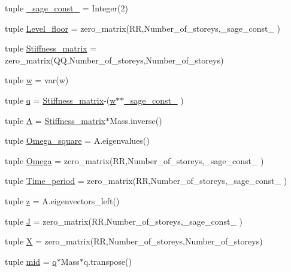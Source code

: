 \begin{DoxyCompactItemize}
\item 
tuple \hyperlink{namespacemain_ad85d7913c0e40b9e1f30e64611a0fafa}{\+\_\+sage\+\_\+const\+\_} = Integer(2)
\item 
tuple \hyperlink{namespacemain_ad7b051da0e829aff37fef1e171e37fa3}{Level\+\_\+floor} = zero\+\_\+matrix(R\+R,Number\+\_\+of\+\_\+storeys,\+\_\+sage\+\_\+const\+\_ )
\item 
tuple \hyperlink{namespacemain_a0011be18dbc87087d6aaf28802f121c0}{Stiffness\+\_\+matrix} = zero\+\_\+matrix(Q\+Q,Number\+\_\+of\+\_\+storeys,Number\+\_\+of\+\_\+storeys)
\item 
tuple \hyperlink{namespacemain_af76005101c339a32cd5d37ba82ee072c}{w} = var(\textquotesingle{}w\textquotesingle{})
\item 
tuple \hyperlink{namespacemain_a1787a37505189f764069a45071189112}{q} = \hyperlink{namespacemain_a0011be18dbc87087d6aaf28802f121c0}{Stiffness\+\_\+matrix}-\/(\hyperlink{namespacemain_af76005101c339a32cd5d37ba82ee072c}{w}$\ast$$\ast$\hyperlink{namespacemain_ad85d7913c0e40b9e1f30e64611a0fafa}{\+\_\+sage\+\_\+const\+\_} )
\item 
tuple \hyperlink{namespacemain_ad101f166a53497f04b37636bcadbfe65}{A} = \hyperlink{namespacemain_a0011be18dbc87087d6aaf28802f121c0}{Stiffness\+\_\+matrix}$\ast$Mass.\+inverse()
\item 
tuple \hyperlink{namespacemain_a63066086ca439ff34de16475b00387f5}{Omega\+\_\+square} = A.\+eigenvalues()
\item 
tuple \hyperlink{namespacemain_af44dcb60e61649c65257466d65b4d548}{Omega} = zero\+\_\+matrix(R\+R,Number\+\_\+of\+\_\+storeys,\+\_\+sage\+\_\+const\+\_ )
\item 
tuple \hyperlink{namespacemain_a6bf4b8266bcb3b4f390149620fea3d6c}{Time\+\_\+period} = zero\+\_\+matrix(R\+R,Number\+\_\+of\+\_\+storeys,\+\_\+sage\+\_\+const\+\_ )
\item 
tuple \hyperlink{namespacemain_a2d5b336e3b2f7d2e14f04fa3cc413457}{z} = A.\+eigenvectors\+\_\+left()
\item 
tuple \hyperlink{namespacemain_a00488f5887e168f7781b6fb94dd08518}{J} = zero\+\_\+matrix(R\+R,Number\+\_\+of\+\_\+storeys,\+\_\+sage\+\_\+const\+\_ )
\item 
tuple \hyperlink{namespacemain_a5eac8e4368036ef94463d6e42c1628c5}{X} = zero\+\_\+matrix(R\+R,Number\+\_\+of\+\_\+storeys,Number\+\_\+of\+\_\+storeys)
\item 
tuple \hyperlink{namespacemain_a70551c7fc78da8fdec83fe500056d388}{mid} = \hyperlink{namespacemain_a1787a37505189f764069a45071189112}{q}$\ast$Mass$\ast$q.\+transpose()
$$
\end{DoxyCompactItemize}
